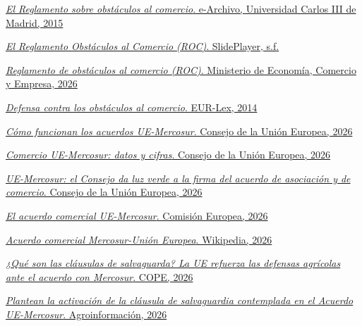\documentclass[10pt,a4paper]{article}
\begin{document}
\href{https://e-archivo.uc3m.es/bitstreams/aedef20b-ef53-4bb2-93b1-128d15089a5e/download}{\textit{El Reglamento sobre obstáculos al comercio}. e-Archivo, Universidad Carlos III de Madrid, 2015}

\href{https://slideplayer.es/slide/4152497/}{\textit{El Reglamento Obstáculos al Comercio (ROC)}. SlidePlayer, s.f.}

\href{https://comercio.gob.es/Barreras_Comerciales/barreras-terceros-paises/Paginas/ROC.aspx}{\textit{Reglamento de obstáculos al comercio (ROC)}. Ministerio de Economía, Comercio y Empresa, 2026}

\href{https://eur-lex.europa.eu/legal-content/ES/TXT/?uri=LEGISSUM:r11007}{\textit{Defensa contra los obstáculos al comercio}. EUR-Lex, 2014}

\href{https://www.consilium.europa.eu/es/policies/eu-mercosur-agreements-explained/}{\textit{Cómo funcionan los acuerdos UE-Mercosur}. Consejo de la Unión Europea, 2026}

\href{https://www.consilium.europa.eu/es/infographics/eu-mercosur-trade/}{\textit{Comercio UE-Mercosur: datos y cifras}. Consejo de la Unión Europea, 2026}

\href{https://www.consilium.europa.eu/es/press/press-releases/2026/01/09/eu-mercosur-council-greenlights-signature-of-the-comprehensive-partnership-and-trade-agreement/}{\textit{UE-Mercosur: el Consejo da luz verde a la firma del acuerdo de asociación y de comercio}. Consejo de la Unión Europea, 2026}

\href{https://commission.europa.eu/topics/trade/eu-mercosur-trade-agreement_es}{\textit{El acuerdo comercial UE-Mercosur}. Comisión Europea, 2026}

\href{https://es.wikipedia.org/wiki/Acuerdo_comercial_Mercosur-Uni%C3%B3n_Europea}{\textit{Acuerdo comercial Mercosur-Unión Europea}. Wikipedia, 2026}

\href{https://www.cope.es/emisoras/la-rioja/la-rioja-provincia/logrono/noticias/son-clausulas-salvaguarda-ue-refuerza-defensas-agricolas-acuerdo-mercosur-activara-medidas-suben-importaciones-caen-precios-20260211_3305384.amp.html}{\textit{¿Qué son las cláusulas de salvaguarda? La UE refuerza las defensas agrícolas ante el acuerdo con Mercosur}. COPE, 2026}

\href{https://agroinformacion.com/plantean-la-activacion-de-la-clausula-de-salvaguardia-contemplada-en-el-acuerdo-ue-mercosur-por-el-desplome-de-las-cotizaciones-del-vacuno/}{\textit{Plantean la activación de la cláusula de salvaguardia contemplada en el Acuerdo UE-Mercosur}. Agroinformación, 2026}
\end{document}
